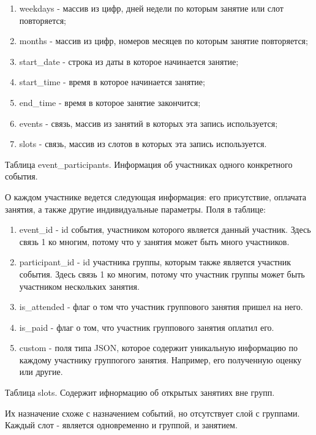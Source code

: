\documentclass[a4paper,14pt,oneside]{extreport}
\begin{document}
\begin{enumerate}[label=\arabic*)]
    \item  weekdays - массив из цифр, дней недели по которым занятие или слот повторяется;
    \item months - массив из цифр, номеров месяцев по которым занятие повторяется;
    \item start\_date - строка из даты в которое начинается занятие;
    \item start\_time - время в которое начинается занятие;
    \item end\_time - время в которое занятие закончится;
    \item events - связь, массив из занятий в которых эта запись используется;
    \item slots - связь, массив из слотов в которых эта запись используется.
\end{enumerate}


Таблица event\_participants. Информация об участниках одного конкретного события.

О каждом участнике ведется следующая информация: его присутствие, оплачата занятия, а также другие индивидуальные параметры.
Поля в таблице:

\begin{enumerate}
    \item event\_id  - id события, участником которого является данный участник. Здесь связь 1 ко многим, потому что у занятия может быть много участников.
    \item participant\_id - id участника группы, которым также является участник события. Здесь связь 1 ко многим, потому что участник группы может быть участником нескольких занятия.
    \item is\_attended - флаг о том что участник группового занятия пришел на него.
    \item is\_paid - флаг о том, что участник группового занятия оплатил его.

    \item custom - поля типа JSON, которое содержит уникальную информацию по каждому участнику группогого занятия. Например, его полученную оценку или другие.
\end{enumerate}

Таблица slots. Содержит ифнормацию об открытых занятиях вне групп. 

Их назначение схоже с назначением событий, но отсутствует слой с группами. Каждый слот - является одновременно и группой, и занятием.
\end{document}
